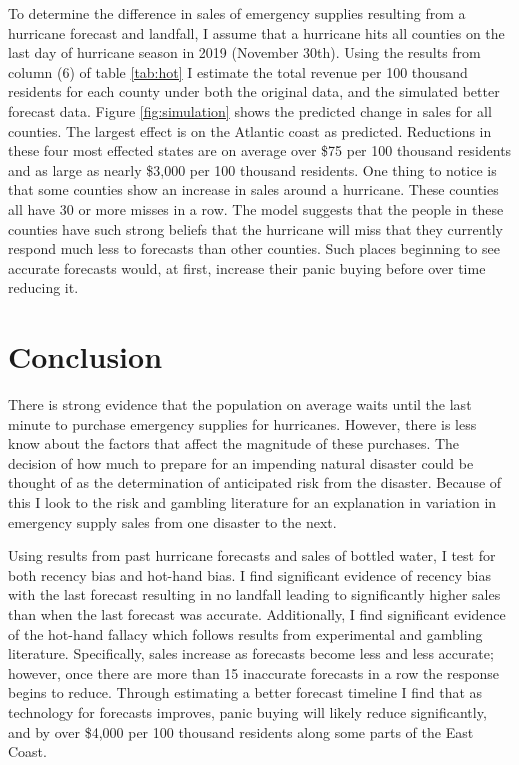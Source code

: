 \documentclass{article}
\begin{document}
To determine the difference in sales of emergency supplies resulting from a hurricane forecast and landfall, I assume that a hurricane hits all counties on the last day of hurricane season in 2019 (November 30th). Using the results from column (6) of table \ref{tab:hot} I estimate the total revenue per 100 thousand residents for each county under both the original data, and the simulated better forecast data. Figure \ref{fig:simulation} shows the predicted change in sales for all counties. The largest effect is on the Atlantic coast as predicted. Reductions in these four most effected states are on average over \$75 per 100 thousand residents and as large as nearly \$3,000 per 100 thousand residents. One thing to notice is that some counties show an increase in sales around a hurricane. These counties all have 30 or more misses in a row. The model suggests that the people in these counties have such strong beliefs that the hurricane will miss that they currently respond much less to forecasts than other counties. Such places beginning to see accurate forecasts would, at first, increase their panic buying before over time reducing it. 

\section{Conclusion}

There is strong evidence that the population on average waits until the last minute to purchase emergency supplies for hurricanes. However, there is less know about the factors that affect the magnitude of these purchases. The decision of how much to prepare for an impending natural disaster could be thought of as the determination of anticipated risk from the disaster. Because of this I look to the risk and gambling literature for an explanation in variation in emergency supply sales from one disaster to the next. 

Using results from past hurricane forecasts and sales of bottled water, I test for both recency bias and hot-hand bias. I find significant evidence of recency bias with the last forecast resulting in no landfall leading to significantly higher sales than when the last forecast was accurate. Additionally, I find significant evidence of the hot-hand fallacy which follows results from experimental and gambling literature. Specifically, sales increase as forecasts become less and less accurate; however, once there are more than 15 inaccurate forecasts in a row the response begins to reduce. Through estimating a better forecast timeline I find that as technology for forecasts improves, panic buying will likely reduce significantly, and by over \$4,000 per 100 thousand residents along some parts of the East Coast. 
\end{document}
